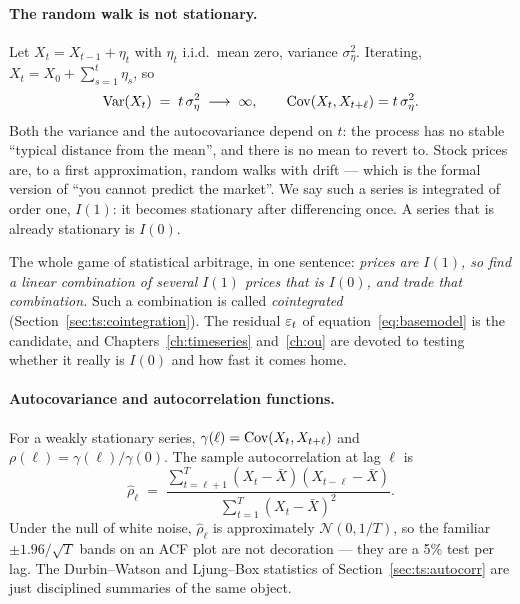 \paragraph{The random walk is not stationary.} Let $X_t = X_{t-1}+\eta_t$ with
$\eta_t$ i.i.d.\ mean zero, variance $\sigma_\eta^2$. Iterating,
$X_t = X_0 + \sum_{s=1}^t \eta_s$, so
\begin{equation}
  \operatorname{Var}(X_t) \;=\; t\,\sigma_\eta^2 \;\longrightarrow\;\infty ,
  \qquad
  \operatorname{Cov}(X_t, X_{t+\ell}) = t\,\sigma_\eta^2 .
  \label{eq:rwvariance}
\end{equation}
Both the variance and the autocovariance depend on $t$: the process has no stable
``typical distance from the mean'', and there is no mean to revert to. Stock prices are,
to a first approximation, random walks with drift --- which is the formal version of
``you cannot predict the market''. We say such a series is integrated of order one,
$I(1)$: it becomes stationary after differencing once. A series that is already
stationary is $I(0)$.

\begin{intuition}
The whole game of statistical arbitrage, in one sentence: \emph{prices are $I(1)$, so
find a linear combination of several $I(1)$ prices that is $I(0)$, and trade that
combination.} Such a combination is called \emph{cointegrated}
(Section~\ref{sec:ts:cointegration}). The residual $\varepsilon_t$ of
equation~\eqref{eq:basemodel} is the candidate, and Chapters~\ref{ch:timeseries}
and~\ref{ch:ou} are devoted to testing whether it really is $I(0)$ and how fast it
comes home.
\end{intuition}

\paragraph{Autocovariance and autocorrelation functions.} For a weakly stationary
series, $\gamma(\ell)=\operatorname{Cov}(X_t,X_{t+\ell})$ and
$\rho(\ell)=\gamma(\ell)/\gamma(0)$. The sample autocorrelation at lag $\ell$ is
\begin{equation}
  \hat\rho_\ell \;=\; \frac{\sum_{t=\ell+1}^{T}(X_t-\bar X)(X_{t-\ell}-\bar X)}
                          {\sum_{t=1}^{T}(X_t-\bar X)^2}.
  \label{eq:acf}
\end{equation}
Under the null of white noise, $\hat\rho_\ell$ is approximately
$\mathcal N(0,1/T)$, so the familiar $\pm 1.96/\sqrt T$ bands on an ACF plot are not
decoration --- they are a 5\% test per lag. The Durbin--Watson and Ljung--Box statistics
of Section~\ref{sec:ts:autocorr} are just disciplined summaries of the same object.

